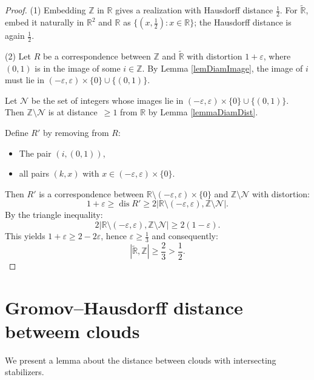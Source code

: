 \documentclass[leqno]{article}
\begin{document}
\begin{proof}
    (1) Embedding $\mathbb{Z}$ in $\mathbb{R}$ gives a realization with
    Hausdorff distance $\frac{1}{2}$. For $\widetilde{\mathbb{R}}$,
    embed it naturally in $\mathbb{R}^2$ and $\mathbb{R}$ as $\{(x,
    \frac{1}{2}) : x \in \mathbb{R}\}$; the Hausdorff distance is again
    $\frac{1}{2}$.

    (2) Let $R$ be a correspondence between $\mathbb{Z}$ and
    $\widetilde{\mathbb{R}}$ with distortion $1 + \varepsilon$, where
    $(0,1)$ is in the image of some $i \in \mathbb{Z}$. By Lemma
    \ref{lemDiamImage}, the image of $i$ must lie in $(-\varepsilon,
    \varepsilon) \times \{0\} \cup \{(0,1)\}$.

    Let $\mathcal{N}$ be the set of integers whose images lie in
    $(-\varepsilon, \varepsilon) \times \{0\} \cup \{(0,1)\}$. Then
    $\mathbb{Z} \setminus \mathcal{N}$ is at \mbox{distance $\geq 1$}
    from $\mathbb{R}$ by Lemma \ref{lemmaDiamDist}.

    Define $R'$ by removing from $R$:
    \begin{itemize}
        \item The pair $(i,(0,1))$,
        \item all pairs $(k,x)$ with $x \in (-\varepsilon, \varepsilon)
            \times \{0\}$.
    \end{itemize}

    Then $R'$ is a correspondence between
    $\mathbb{R}\setminus(-\varepsilon, \varepsilon) \times \{0\}$ and
    $\mathbb{Z} \setminus \mathcal{N}$ with distortion:
    $$
    1+\varepsilon \geq \operatorname{dis} R' \geq
    2\big|\mathbb{R}\setminus(-\varepsilon, \varepsilon), \mathbb{Z}
    \setminus \mathcal{N}\big|.
    $$
    By the triangle inequality:
    $$
    2\big|\mathbb{R}\setminus(-\varepsilon, \varepsilon), \mathbb{Z}
    \setminus \mathcal{N}\big| \geq 2(1 - \varepsilon).
    $$
    This yields $1+\varepsilon \geq 2-2\varepsilon$, hence $\varepsilon
    \geq \frac{1}{3}$ and consequently:
    $$
    |\widetilde{\mathbb{R}}, \mathbb{Z}| \geq \frac{2}{3} > \frac{1}{2}.
    $$
\end{proof}

\section{Gromov--Hausdorff distance betweem clouds}

We present a lemma about the distance between clouds with
intersecting stabilizers.
\end{document}
